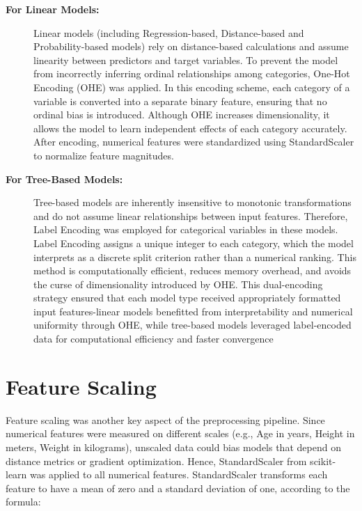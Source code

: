 \begin{description}
    \item[\textbf{For Linear Models:}]
    Linear models (including Regression-based, Distance-based and Probability-based models) rely on distance-based calculations and assume linearity between predictors and target variables.
    To prevent the model from incorrectly inferring ordinal relationships among categories, One-Hot Encoding (OHE) was applied.
    In this encoding scheme, each category of a variable is converted into a separate binary feature, ensuring that no ordinal bias is introduced.
    Although OHE increases dimensionality, it allows the model to learn independent effects of each category accurately.
    After encoding, numerical features were standardized using StandardScaler to normalize feature magnitudes.

    \item[\textbf{For Tree-Based Models:}]
    Tree-based models are inherently insensitive to monotonic transformations and do not assume linear relationships between input features.
    Therefore, Label Encoding was employed for categorical variables in these models.
    Label Encoding assigns a unique integer to each category, which the model interprets as a discrete split criterion rather than a numerical ranking.
    This method is computationally efficient, reduces memory overhead, and avoids the curse of dimensionality introduced by OHE. This dual-encoding strategy ensured that each model type received appropriately formatted input features-linear models benefitted from interpretability and numerical uniformity through OHE, while tree-based models leveraged label-encoded data for computational efficiency and faster convergence
\end{description}



\section{Feature Scaling}\label{sec:feature-scaling}

Feature scaling was another key aspect of the preprocessing pipeline.
Since numerical features were measured on different scales (e.g., Age in years, Height in meters, Weight in kilograms), unscaled data could bias models that depend on distance metrics or gradient optimization.
Hence, StandardScaler from scikit-learn was applied to all numerical features.
StandardScaler transforms each feature to have a mean of zero and a standard deviation of one, according to the formula:

